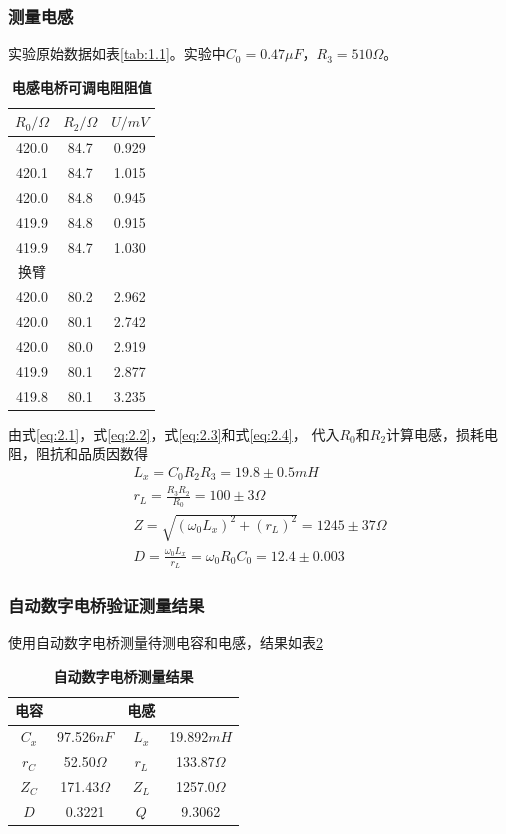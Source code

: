 \documentclass[10pt,a4paper,twocolumn,twoside,UTF8]{ctexart}
\begin{document}
		\subsubsection{测量电感}
		实验原始数据如表\ref{tab:1.1}。实验中$C_0=0.47 \mu F$，$R_3 = 510 \Omega$。
			\begin{table}[htbp]
				\centering
					\begin{tabular}{ccc}
						\toprule
						$R_0 / \Omega$	&$R_2 / \Omega$	&$U /mV$ \\
						\midrule
						420.0	&84.7	&0.929	\\
						420.1	&84.7	&1.015	\\
						420.0	&84.8	&0.945	\\
						419.9	&84.8	&0.915	\\
						419.9	&84.7	&1.030	\\
						\midrule
						换臂 & & \\
						\midrule
						420.0	&80.2	&2.962	\\
						420.0	&80.1	&2.742	\\
						420.0	&80.0	&2.919	\\
						419.9	&80.1	&2.877	\\
						419.8	&80.1	&3.235	\\	
						\bottomrule
					\end{tabular}
					\caption{\textbf{电感电桥可调电阻阻值}}
					\label{tab:1.2}
			\end{table}

		由式\ref{eq:2.1}，式\ref{eq:2.2}，式\ref{eq:2.3}和式\ref{eq:2.4}，
		代入$R_0$和$R_2$计算电感，损耗电阻，阻抗和品质因数得
			\begin{gather}
				L_x = C_0R_2R_3 = 19.8 \pm 0.5 mH\\
				r_L = \frac{R_3R_2}{R_0} = 100 \pm 3 \Omega \\
				Z = \sqrt{(\omega_0 L_x)^2+(r_L)^2} = 1245 \pm 37 \Omega \\
				D = \frac{\omega_0L_x}{r_L} = \omega_0R_0C_0 = 12.4 \pm 0.003
			\end{gather}

		\subsubsection{自动数字电桥验证测量结果}
		使用自动数字电桥测量待测电容和电感，结果如表\ref{tab:2}
		\begin{table}[htbp]
			\centering
				\begin{tabular}{cccc}
					\toprule
					电容	&	&电感	& \\
					\midrule
					$C_x$	&97.526$nF$	&$L_x$	&19.892$mH$	\\
					$r_C$	&52.50$\Omega$	&$r_L$	&133.87$\Omega$	\\
					$Z_C$	&171.43$\Omega$	&$Z_L$	&1257.0$\Omega$	\\
					$D$		&0.3221			&$Q$	&9.3062	\\
					\bottomrule
				\end{tabular}
				\caption{\textbf{自动数字电桥测量结果}}
				\label{tab:2}
		\end{table}
\end{document}
